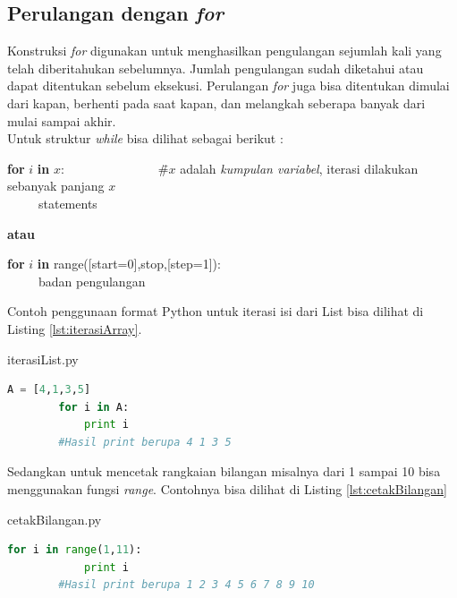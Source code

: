 
\newpage

\subsection{Perulangan dengan \textit{for}}
Konstruksi \textit{for} digunakan untuk menghasilkan pengulangan sejumlah kali yang telah diberitahukan sebelumnya. Jumlah pengulangan sudah diketahui atau dapat ditentukan sebelum eksekusi. Perulangan \textit{for} juga bisa ditentukan dimulai dari kapan, berhenti pada saat kapan, dan melangkah seberapa banyak dari mulai sampai akhir. \\

Untuk struktur \textit{while} bisa dilihat sebagai berikut : 
\begin{tabbing}
\textbf{for} $i$ \textbf{in} $x$:~~~~~~~~~~~~~~~\=\#$x$ adalah \textit{kumpulan variabel}, iterasi dilakukan sebanyak panjang $x$\\
~~~~~statements\\
\end{tabbing}
\textbf{atau}
\begin{tabbing}
\textbf{for} $i$ \textbf{in} range([start=0],stop,[step=1]):\\
~~~~~badan pengulangan\\
\end{tabbing}


Contoh penggunaan format Python untuk iterasi isi dari List bisa dilihat di Listing \ref{lst:iterasiArray}.
\begin{listprog}{iterasiList.py}
	\label{lst:iterasiArray}
	\begin{lstlisting}[language=Python]
		A = [4,1,3,5]
		for i in A:
			print i
		#Hasil print berupa 4 1 3 5
	\end{lstlisting}
\end{listprog}

Sedangkan untuk mencetak rangkaian bilangan misalnya dari 1 sampai 10 bisa menggunakan fungsi \textit{range}. Contohnya bisa dilihat di Listing \ref{lst:cetakBilangan}
\begin{listprog}{cetakBilangan.py}
	\label{lst:cetakBilangan}
	\begin{lstlisting}[language=Python]
		for i in range(1,11):
			print i
		#Hasil print berupa 1 2 3 4 5 6 7 8 9 10
	\end{lstlisting}
\end{listprog}

